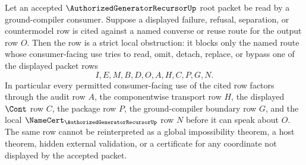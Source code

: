 \begin{corollary}
\label{cor:authorized-generator-recursor-ground-compiler-authorization-strict-obstruction}
Let an accepted $\AuthorizedGeneratorRecursorUp$ root packet be read by a ground-compiler consumer. Suppose a displayed failure, refusal, separation, or countermodel row is cited against a named converse or reuse route for the output row $O$. Then the row is a strict local obstruction: it blocks only the named route whose consumer-facing use tries to read, omit, detach, replace, or bypass one of the displayed packet rows
$$
I,E,M,B,D,O,A,H,C,P,G,N.
$$
In particular every permitted consumer-facing use of the cited row factors through the audit row $A$, the componentwise transport row $H$, the displayed $\Cont$ row $C$, the package row $P$, the ground-compiler boundary row $G$, and the local $\NameCert_{\AuthorizedGeneratorRecursorUp}$ row $N$ before it can speak about $O$. The same row cannot be reinterpreted as a global impossibility theorem, a host theorem, hidden external validation, or a certificate for any coordinate not displayed by the accepted packet.
\end{corollary}

